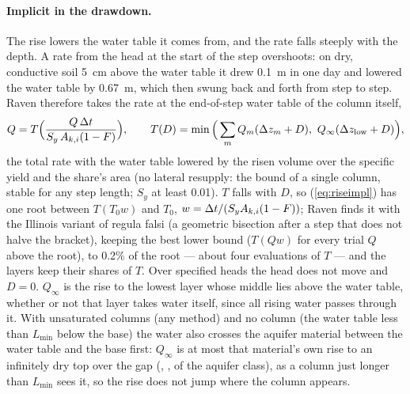 \paragraph{Implicit in the drawdown.} The rise lowers the water table it comes from, and the rate falls steeply with the
depth. A rate from the head at the start of the step overshoots: on dry, conductive soil 5~cm above the water table it
drew 0.1~m in one day and lowered the water table by 0.67~m, which then swung back and forth from step to step. Raven
therefore takes the rate at the end-of-step water table of the column itself,
\begin{equation}\label{eq:riseimpl}
Q=T\Big(\frac{Q\,\Delta t}{S_y\,A_{k,i}(1-F)}\Big),\qquad T(D)=\min\Big(\sum_m Q_m(\Delta z_m+D),\ Q_{\infty}(\Delta z_{\mathrm{low}}+D)\Big),
\end{equation}
the total rate with the water table lowered by the risen volume over the specific yield and the share's area (no
lateral resupply: the bound of a single column, stable for any step length; $S_y$ at least 0.01). $T$ falls with $D$,
so (\ref{eq:riseimpl}) has one root between $T(T_0w)$ and $T_0$, $w=\Delta t/(S_yA_{k,i}(1-F))$; Raven finds it with the
Illinois variant of regula falsi (a geometric bisection after a step that does not halve the bracket), keeping the best
lower bound ($T(Qw)$ for every trial $Q$ above the root), to 0.2\% of the root --- about four evaluations of $T$ ---
and the layers keep their shares of $T$. Over specified heads the head does not move and $D=0$. $Q_\infty$ is the rise to
the lowest layer whose middle lies above the water table, whether or not that layer takes water itself, since all rising
water passes through it. With unsaturated columns (any  method) and no column (the water table less than $L_{\min}$ below
the base) the water also crosses the aquifer material between the water table and the base first: $Q_\infty$ is at most
that material's own rise to an infinitely dry top over the gap (, , 
of the aquifer class), as a column just longer than $L_{\min}$ sees it, so the rise does not jump where the column
appears.

